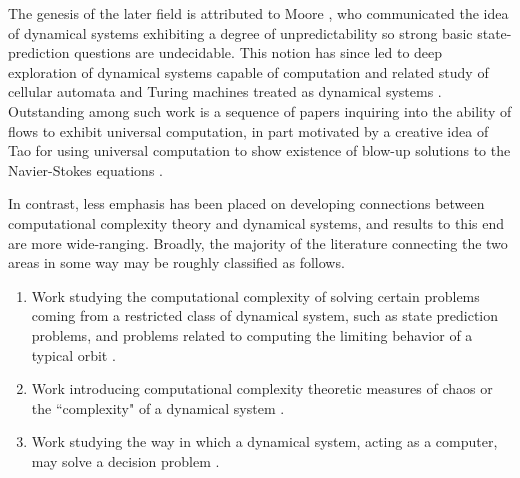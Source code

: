 \documentclass{amsart}
\theoremstyle{theorem}
\theoremstyle{remark}
\numberwithin{equation}{section}
\begin{document}
The genesis of the later field is attributed to Moore \cite{moore1990unpredictability,moore1991generalized}, who communicated the idea of dynamical systems exhibiting a degree of unpredictability so strong basic state-prediction questions are undecidable.
This notion has since led to deep exploration of dynamical systems capable of computation \cite{cotler2024computational,koiran1999closed,PhysRevLett.83.1463,bournez2013computation} and related study of cellular automata and Turing machines treated as dynamical systems \cite{bruera2024topological,kuurka2001topological,kuurka1997languages,kuurka1997topological}.
Outstanding among such work is a sequence of papers inquiring into the ability of flows to exhibit universal computation, in part motivated by a creative idea of Tao for using universal computation to show existence of blow-up solutions to the Navier-Stokes equations \cite{cardona2021constructing,cardona2022turing,cardona2024hydrodynamic,tao2016finite,tao2017universality,cardona2024towards}.

In contrast, less emphasis has been placed on developing connections between computational complexity theory and dynamical systems, and results to this end are more wide-ranging.
Broadly, the majority of the literature connecting the two areas in some way may be roughly classified as follows.
\begin{enumerate}
\item Work studying the computational complexity of solving certain problems coming from a restricted class of dynamical system, such as state prediction problems, and problems related to computing the limiting behavior of a typical orbit \cite{applebaum2010cryptography,barrett2007predecessor,barrett2006complexity,papadimitriou2016computational,buss1990predictability,dudko2016poly,binder2006computational,dufort1997dynamics,rosenkrantz2024synchronous,ogihara2017computational,rojas2025algorithmic,de2018characterization,rojas2019computational,boyer2015mu}.
\item Work introducing computational complexity theoretic measures of chaos or the ``complexity" of a dynamical system \cite{crutchfield1989inferring,lloyd1988complexity,grassberger2005complexity,cecconi2003complexity,eckmann1985ergodic,stoop2004complexity}.
\item Work studying the way in which a dynamical system, acting as a computer, may solve a decision problem \cite{PhysRevLett.83.1463,cotler2024computational,bruera2024topological,ercsey2011optimization,sudoku2012chaos,bournez2017polynomial}.
\end{enumerate}
\end{document}
